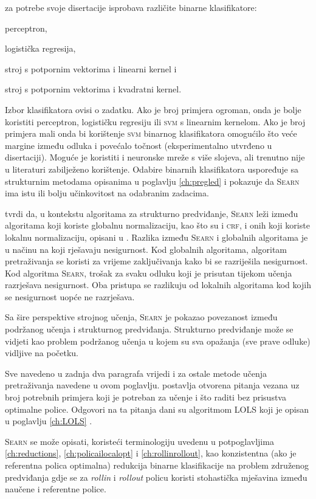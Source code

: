 \citeauthor{daume06thesis} za potrebe svoje disertacije isprobava različite
binarne klasifikatore:
\begin{inlinelist}
  \item perceptron,
  \item logistička regresija,
  \item stroj s potpornim vektorima i linearni kernel i
  \item stroj s potpornim vektorima i kvadratni kernel.
\end{inlinelist}
Izbor klasifikatora ovisi o zadatku. Ako je broj primjera ogroman, onda je bolje
koristiti perceptron, logističku regresiju ili \textsc{svm} s linearnim
kernelom. Ako je broj primjera mali onda bi korištenje \textsc{svm} binarnog
klasifikatora omogućilo što veće margine između odluka i povećalo točnost
(eksperimentalno utvrđeno u disertaciji). Moguće je koristiti i neuronske mreže
s više slojeva, ali trenutno nije u literaturi zabilježeno korištenje. Odabire
binarnih klasifikatora \citeauthor{daume06thesis} uspoređuje sa strukturnim
metodama opisanima u poglavlju \ref{ch:pregled} i pokazuje da \textsc{Searn} ima
istu ili bolju učinkovitost na odabranim zadacima.

\citeauthor{daume06thesis} tvrdi da, u kontekstu algoritama za strukturno
predviđanje, \textsc{Searn} leži između algoritama koji koriste globalnu
normalizaciju, kao što su \mmmm{} i \textsc{crf}, i onih koji koriste lokalnu
normalizaciju, opisani u \citep{punyakanok2001use}. Razlika između
\textsc{Searn} i globalnih algoritama je u načinu na koji rješavaju nesigurnost.
Kod globalnih algoritama, algoritam pretraživanja se koristi za vrijeme
zaključivanja kako bi se razriješila nesigurnost. Kod algoritma \textsc{Searn},
trošak za svaku odluku koji je prisutan tijekom učenja razrješava nesigurnost.
Oba pristupa se razlikuju od lokalnih algoritama kod kojih se nesigurnost uopće
ne razrješava.

Sa šire perspektive strojnog učenja, \textsc{Searn} je pokazao povezanost između
podržanog učenja i strukturnog predviđanja. Strukturno predviđanje može se
vidjeti kao problem podržanog učenja u kojem su sva opažanja (sve prave odluke)
vidljive na početku.

Sve navedeno u zadnja dva paragrafa vrijedi i za ostale metode učenja
pretraživanja navedene u ovom poglavlju. \citeauthor{daume06thesis} postavlja
otvorena pitanja vezana uz broj potrebnih primjera koji je potreban za učenje i
što raditi bez prisustva optimalne police. Odgovori na ta pitanja dani su
algoritmom \textsc{LOLS} koji je opisan u poglavlju \ref{ch:LOLS}
\citep{daume15lols}.

\textsc{Searn} se može opisati, koristeći terminologiju uvedenu u potpoglavljima
\ref{ch:reductions}, \ref{ch:policailocalopt} i \ref{ch:rollinrollout}, kao
konzistentna (ako je referentna polica optimalna) redukcija binarne
klasifikacije na problem združenog predviđanja gdje se za \textit{rollin} i
\textit{rollout} policu koristi stohastička mješavina između naučene i
referentne police.
